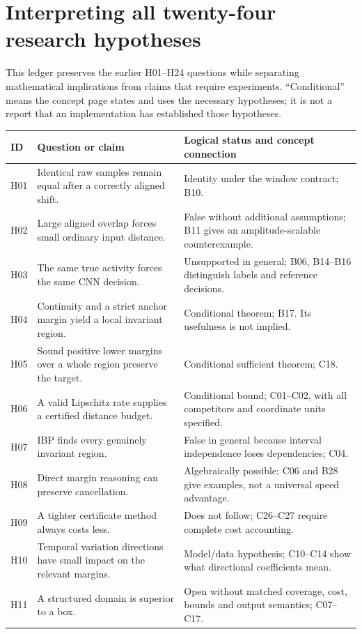 \documentclass[11pt,a4paper]{article}
\begin{document}
\section{Interpreting all twenty-four research hypotheses}
This ledger preserves the earlier H01--H24 questions while separating
mathematical implications from claims that require experiments. ``Conditional''
means the concept page states and uses the necessary hypotheses; it is not
a report that an implementation has established those hypotheses.
\small
\begin{longtable}{@{}P{0.9cm}P{7.2cm}P{7.1cm}@{}}\toprule
ID & Question or claim & Logical status and concept connection\\\midrule\endhead
H01 & Identical raw samples remain equal after a correctly aligned shift. & Identity under the window contract; B10.\\
H02 & Large aligned overlap forces small ordinary input distance. & False without additional assumptions; B11 gives an amplitude-scalable counterexample.\\
H03 & The same true activity forces the same CNN decision. & Unsupported in general; B06, B14--B16 distinguish labels and reference decisions.\\
H04 & Continuity and a strict anchor margin yield a local invariant region. & Conditional theorem; B17. Its usefulness is not implied.\\
H05 & Sound positive lower margins over a whole region preserve the target. & Conditional sufficient theorem; C18.\\
H06 & A valid Lipschitz rate supplies a certified distance budget. & Conditional bound; C01--C02, with all competitors and coordinate units specified.\\
H07 & IBP finds every genuinely invariant region. & False in general because interval independence loses dependencies; C04.\\
H08 & Direct margin reasoning can preserve cancellation. & Algebraically possible; C06 and B28 give examples, not a universal speed advantage.\\
H09 & A tighter certificate method always costs less. & Does not follow; C26--C27 require complete cost accounting.\\
H10 & Temporal variation directions have small impact on the relevant margins. & Model/data hypothesis; C10--C14 show what directional coefficients mean.\\
H11 & A structured domain is superior to a box. & Open without matched coverage, cost, bounds and output semantics; C07--C17.\\

\end{longtable}
\end{document}
